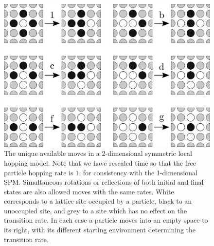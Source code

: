\begin{figure}[h!]
 \caption[The possible transitions which may occur in a symmetric local 2-dimensional hopping model.]{\label{fig:2dTransitions} 
 The unique available moves in a 2-dimensional symmetric local hopping model. Note that we have rescaled time so that the free particle hopping rate is $1$, for consistency with the 1-dimensional SPM.
 Simultaneous rotations or reflections of both initial and final states are also allowed moves with the same rates. White corresponds to a lattice site occupied by a particle, black to an unoccupied site, and grey to a site
 which has no effect on the transition rate. In each case a particle moves into an empty space to its right, with its different starting environment determining the transition rate.}
 \includegraphics[width=0.99\linewidth]{analytics/images/2dGenericRates}
\end{figure}


